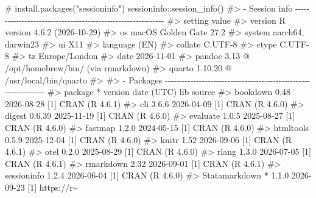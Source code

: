 \documentclass[
  10pt,
  a4paper,
]{book}
\newenvironment{Shaded}{\begin{snugshade}}{\end{snugshade}}
\newcommand{\CommentTok}[1]{\textcolor[rgb]{0.37,0.37,0.37}{#1}}
\newcommand{\FunctionTok}[1]{\textcolor[rgb]{0.28,0.35,0.67}{#1}}
\newcommand{\NormalTok}[1]{\textcolor[rgb]{0.00,0.46,0.62}{#1}}
\newcommand{\SpecialCharTok}[1]{\textcolor[rgb]{0.37,0.37,0.37}{#1}}
\begin{document}
\begin{Shaded}
\begin{Highlighting}[]
\CommentTok{\# install.packages("sessioninfo")}
\NormalTok{sessioninfo}\SpecialCharTok{::}\FunctionTok{session\_info}\NormalTok{()}
\CommentTok{\#\textgreater{} {-} Session info {-}{-}{-}{-}{-}{-}{-}{-}{-}{-}{-}{-}{-}{-}{-}{-}{-}{-}{-}{-}{-}{-}{-}{-}{-}{-}{-}{-}{-}{-}{-}{-}{-}{-}{-}{-}{-}{-}{-}{-}{-}{-}{-}{-}{-}{-}{-}{-}{-}{-}{-}{-}{-}{-}{-}{-}{-}{-}{-}{-}{-}}
\CommentTok{\#\textgreater{}  setting  value}
\CommentTok{\#\textgreater{}  version  R version 4.6.2 (2026{-}10{-}29)}
\CommentTok{\#\textgreater{}  os       macOS Golden Gate 27.2}
\CommentTok{\#\textgreater{}  system   aarch64, darwin23}
\CommentTok{\#\textgreater{}  ui       X11}
\CommentTok{\#\textgreater{}  language (EN)}
\CommentTok{\#\textgreater{}  collate  C.UTF{-}8}
\CommentTok{\#\textgreater{}  ctype    C.UTF{-}8}
\CommentTok{\#\textgreater{}  tz       Europe/London}
\CommentTok{\#\textgreater{}  date     2026{-}11{-}01}
\CommentTok{\#\textgreater{}  pandoc   3.13 @ /opt/homebrew/bin/ (via rmarkdown)}
\CommentTok{\#\textgreater{}  quarto   1.10.20 @ /usr/local/bin/quarto}
\CommentTok{\#\textgreater{} }
\CommentTok{\#\textgreater{} {-} Packages {-}{-}{-}{-}{-}{-}{-}{-}{-}{-}{-}{-}{-}{-}{-}{-}{-}{-}{-}{-}{-}{-}{-}{-}{-}{-}{-}{-}{-}{-}{-}{-}{-}{-}{-}{-}{-}{-}{-}{-}{-}{-}{-}{-}{-}{-}{-}{-}{-}{-}{-}{-}{-}{-}{-}{-}{-}{-}{-}{-}{-}{-}{-}{-}{-}}
\CommentTok{\#\textgreater{}  package       * version date (UTC) lib source}
\CommentTok{\#\textgreater{}  bookdown        0.48    2026{-}08{-}28 [1] CRAN (R 4.6.1)}
\CommentTok{\#\textgreater{}  cli             3.6.6   2026{-}04{-}09 [1] CRAN (R 4.6.0)}
\CommentTok{\#\textgreater{}  digest          0.6.39  2025{-}11{-}19 [1] CRAN (R 4.6.0)}
\CommentTok{\#\textgreater{}  evaluate        1.0.5   2025{-}08{-}27 [1] CRAN (R 4.6.0)}
\CommentTok{\#\textgreater{}  fastmap         1.2.0   2024{-}05{-}15 [1] CRAN (R 4.6.0)}
\CommentTok{\#\textgreater{}  htmltools       0.5.9   2025{-}12{-}04 [1] CRAN (R 4.6.0)}
\CommentTok{\#\textgreater{}  knitr           1.52    2026{-}09{-}06 [1] CRAN (R 4.6.1)}
\CommentTok{\#\textgreater{}  otel            0.2.0   2025{-}08{-}29 [1] CRAN (R 4.6.0)}
\CommentTok{\#\textgreater{}  rlang           1.3.0   2026{-}07{-}05 [1] CRAN (R 4.6.1)}
\CommentTok{\#\textgreater{}  rmarkdown       2.32    2026{-}09{-}01 [1] CRAN (R 4.6.1)}
\CommentTok{\#\textgreater{}  sessioninfo     1.2.4   2026{-}06{-}04 [1] CRAN (R 4.6.0)}
\CommentTok{\#\textgreater{}  Statamarkdown * 1.1.0   2026{-}09{-}23 [1] https://r\textasciitilde{}}

\end{Highlighting}
\end{Shaded}
\end{document}
